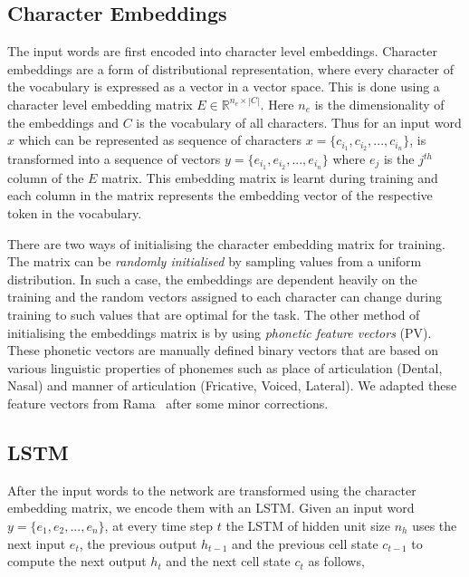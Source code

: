 \documentclass[11pt,letterpaper]{article}
\begin{document}
\subsection{Character Embeddings}

The input words are first encoded into character level embeddings. Character embeddings are a form of distributional representation, where every character of the vocabulary is expressed as a vector in a vector space. This is done using a character level embedding matrix $E \in \mathbb{R}^{n_e \times |C|}$. Here $n_e$ is the dimensionality of the embeddings and $C$ is the vocabulary of all characters. Thus for an input word $x$ which can be represented as sequence of characters $x = \{c_{i_1}, c_{i_2}, ..., c_{i_n}\}$, is transformed into a sequence of vectors $y = \{e_{i_1}, e_{i_2}, ..., e_{i_n}\}$ where $e_j$ is the $j^{th}$ column of the $E$ matrix. This embedding matrix is learnt during training and each column in the matrix represents the embedding vector of the respective token in the vocabulary. 

There are two ways of initialising the character embedding matrix for training. The matrix can be \textit{randomly initialised} by sampling values from a uniform distribution. In such a case, the embeddings are dependent heavily on the training and the random vectors assigned to each character can change during training to such values that are optimal for the task. The other method of initialising the embeddings matrix is by using \textit{phonetic feature vectors} (PV). These phonetic vectors are manually defined binary vectors that are based on various linguistic properties of phonemes such as place of articulation (Dental, Nasal) and manner of articulation (Fricative, Voiced, Lateral). We adapted these feature vectors from Rama~ after some minor corrections.

\subsection{LSTM}

After the input words to the network are transformed using the character embedding matrix, we encode them with an LSTM. Given an input word $y = \{e_1, e_2, ..., e_n\}$, at every time step $t$ the LSTM of hidden unit size $n_h$ uses the next input $e_t$, the previous output $h_{t-1}$ and the previous cell state $c_{t-1}$ to compute the next output $h_t$ and the next cell state $c_t$ as follows,
\end{document}
